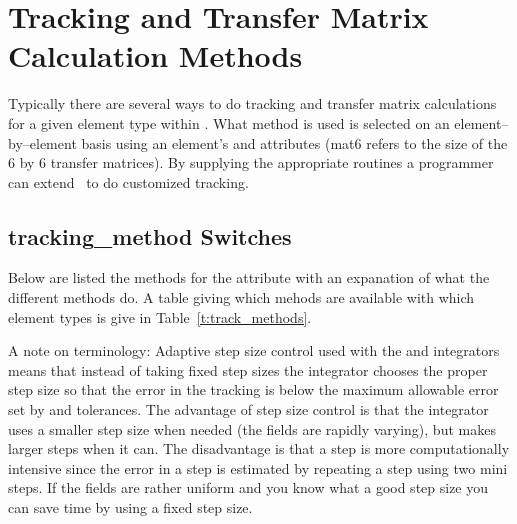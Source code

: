 \chapter{Tracking and Transfer Matrix Calculation Methods}

Typically there are several ways to do tracking and transfer matrix
calculations for a given element type within \bmad. What method is used
is selected on an element--by--element basis using
an element's  and  attributes 
(mat6 refers to the size of the 6 by 6 transfer matrices). By supplying
the appropriate routines a programmer can extend \bmad\ to do customized 
tracking.

\section{tracking\_method Switches}
\label{s:tkm}

Below are listed the methods for the 
attribute with an expanation of what the different methods do. A
table giving which mehods are available with which element types is give
in Table~\ref{t:track_methods}. 

A note on terminology: Adaptive step size control used with the
 and  integrators means that 
instead of taking fixed step sizes the integrator chooses the proper
step size so that the error in the tracking is below the maximum
allowable error set by  and  tolerances. The
advantage of step size control is that the integrator uses a smaller
step size when needed (the fields are rapidly varying), but makes
larger steps when it can. The disadvantage is that a step is more
computationally intensive since the error in a step is estimated by
repeating a step using two mini steps. If the fields are rather
uniform and you know what a good step size you can save time by using
a fixed step size.

